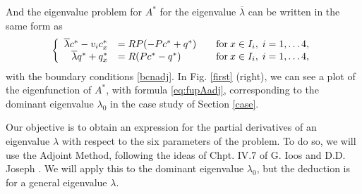 \documentclass[a4paper]{article}
\numberwithin{equation}{section}
\begin{document}
And the eigenvalue problem for $A^*$ for the eigenvalue $\overline{\lambda}$ can be written in the same form as
\begin{equation}\label{two}
\left\{ \begin{array}{rll}
\overline{\lambda} c^*-v_i c^*_x&=RP(-Pc^*+q^*)&\quad \hbox{for}\: x\in I_i, \; i=1,\dots 4, \\
\overline{\lambda} q^*+q^*_x&=R(Pc^*-q^*)&\quad \hbox{for}\: x\in I_i, \; i=1,\dots 4,
\end{array}\right.
\end{equation}
with the boundary conditions \eqref{bcnadj}.  In Fig. \ref{first} (right), we can see a plot of the eigenfunction of $A^*$, with formula \eqref{eq:fupAadj}, corresponding to the dominant eigenvalue $\lambda_0$ in the case study of Section \ref{case}.

%
%
Our objective is to obtain an expression for the partial derivatives of an eigenvalue $\lambda$
with respect to the six parameters of the problem. To do so, we will use the Adjoint Method, following the ideas of Chpt. IV.7 of G. Ioos and D.D. Joseph \cite{Ioos}. We will apply this to the dominant eigenvalue $\lambda_0$, but the deduction is for a general eigenvalue $\lambda$.
\end{document}
